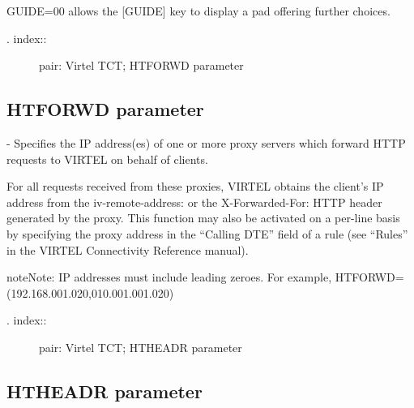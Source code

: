 \documentclass[letterpaper,10pt,english]{sphinxmanual}
\begin{document}
GUIDE=00 allows the {[}GUIDE{]} key to display a pad offering further choices.
\begin{description}
\item[{. index::}] \leavevmode
pair: Virtel TCT; HTFORWD parameter

\end{description}


\subsection{HTFORWD parameter}
\label{\detokenize{Installation_Guide:htforwd-parameter}}
\begin{sphinxVerbatim}[commandchars=\\\{\}]
        
\end{sphinxVerbatim}

 - Specifies the IP address(es) of one or more proxy servers which forward HTTP requests to VIRTEL on behalf of clients.

For all requests received from these proxies, VIRTEL obtains the client’s IP address from the iv-remote-address: or the X-Forwarded-For: HTTP header generated by the proxy. This function may also be activated on a per-line basis by specifying the proxy address in the “Calling DTE” field of a rule (see “Rules” in the VIRTEL Connectivity Reference manual).

\begin{sphinxadmonition}{note}{Note:}
IP addresses must include leading zeroes. For example, HTFORWD=(192.168.001.020,010.001.001.020)
\end{sphinxadmonition}
\begin{description}
\item[{. index::}] \leavevmode
pair: Virtel TCT; HTHEADR parameter

\end{description}


\subsection{HTHEADR parameter}
\label{\detokenize{Installation_Guide:htheadr-parameter}}
\begin{sphinxVerbatim}[commandchars=\\\{\}]
                
\end{sphinxVerbatim}
\end{document}
